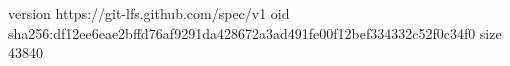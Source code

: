 version https://git-lfs.github.com/spec/v1
oid sha256:df12ee6eae2bffd76af9291da428672a3ad491fe00f12bef334332c52f0c34f0
size 43840
